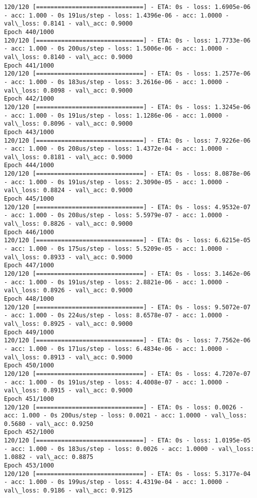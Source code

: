 \documentclass[11pt]{article}
\begin{document}
\begin{Verbatim}[commandchars=\\\{\}]
120/120 [==============================] - ETA: 0s - loss: 1.6905e-06 - acc: 1.000 - 0s 191us/step - loss: 1.4396e-06 - acc: 1.0000 - val\_loss: 0.8141 - val\_acc: 0.9000
Epoch 440/1000
120/120 [==============================] - ETA: 0s - loss: 1.7733e-06 - acc: 1.000 - 0s 200us/step - loss: 1.5006e-06 - acc: 1.0000 - val\_loss: 0.8140 - val\_acc: 0.9000
Epoch 441/1000
120/120 [==============================] - ETA: 0s - loss: 1.2577e-06 - acc: 1.000 - 0s 183us/step - loss: 3.2616e-06 - acc: 1.0000 - val\_loss: 0.8098 - val\_acc: 0.9000
Epoch 442/1000
120/120 [==============================] - ETA: 0s - loss: 1.3245e-06 - acc: 1.000 - 0s 191us/step - loss: 1.1286e-06 - acc: 1.0000 - val\_loss: 0.8096 - val\_acc: 0.9000
Epoch 443/1000
120/120 [==============================] - ETA: 0s - loss: 7.9226e-06 - acc: 1.000 - 0s 208us/step - loss: 1.4372e-04 - acc: 1.0000 - val\_loss: 0.8181 - val\_acc: 0.9000
Epoch 444/1000
120/120 [==============================] - ETA: 0s - loss: 8.0878e-06 - acc: 1.000 - 0s 191us/step - loss: 2.3090e-05 - acc: 1.0000 - val\_loss: 0.8824 - val\_acc: 0.9000
Epoch 445/1000
120/120 [==============================] - ETA: 0s - loss: 4.9532e-07 - acc: 1.000 - 0s 208us/step - loss: 5.5979e-07 - acc: 1.0000 - val\_loss: 0.8826 - val\_acc: 0.9000
Epoch 446/1000
120/120 [==============================] - ETA: 0s - loss: 6.6215e-05 - acc: 1.000 - 0s 175us/step - loss: 5.5209e-05 - acc: 1.0000 - val\_loss: 0.8933 - val\_acc: 0.9000
Epoch 447/1000
120/120 [==============================] - ETA: 0s - loss: 3.1462e-06 - acc: 1.000 - 0s 191us/step - loss: 2.8821e-06 - acc: 1.0000 - val\_loss: 0.8926 - val\_acc: 0.9000
Epoch 448/1000
120/120 [==============================] - ETA: 0s - loss: 9.5072e-07 - acc: 1.000 - 0s 224us/step - loss: 8.6578e-07 - acc: 1.0000 - val\_loss: 0.8925 - val\_acc: 0.9000
Epoch 449/1000
120/120 [==============================] - ETA: 0s - loss: 7.7562e-06 - acc: 1.000 - 0s 171us/step - loss: 6.4834e-06 - acc: 1.0000 - val\_loss: 0.8913 - val\_acc: 0.9000
Epoch 450/1000
120/120 [==============================] - ETA: 0s - loss: 4.7207e-07 - acc: 1.000 - 0s 191us/step - loss: 4.4008e-07 - acc: 1.0000 - val\_loss: 0.8915 - val\_acc: 0.9000
Epoch 451/1000
120/120 [==============================] - ETA: 0s - loss: 0.0026 - acc: 1.000 - 0s 200us/step - loss: 0.0021 - acc: 1.0000 - val\_loss: 0.5680 - val\_acc: 0.9250
Epoch 452/1000
120/120 [==============================] - ETA: 0s - loss: 1.0195e-05 - acc: 1.000 - 0s 183us/step - loss: 0.0026 - acc: 1.0000 - val\_loss: 1.0882 - val\_acc: 0.8875
Epoch 453/1000
120/120 [==============================] - ETA: 0s - loss: 5.3177e-04 - acc: 1.000 - 0s 199us/step - loss: 4.4319e-04 - acc: 1.0000 - val\_loss: 0.9186 - val\_acc: 0.9125

\end{Verbatim}
\end{document}
